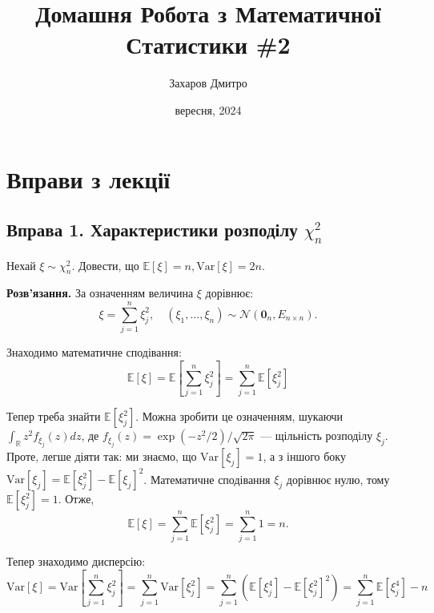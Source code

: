 \documentclass{hw_template}
\title{\huge\sffamily\bfseries Домашня Робота з Математичної Статистики \#2}
\author{\Large\sffamily Захаров Дмитро}
\date{\sffamily 8 вересня, 2024}
\begin{document}
\pagestyle{fancy}

\maketitle

\tableofcontents

\pagebreak

\section{Вправи з лекції}

\subsection{Вправа 1. Характеристики розподілу $\chi_n^2$}
\begin{problem}
    Нехай $\xi \sim \chi_n^2$. Довести, що $\mathbb{E}[\xi]=n, \text{Var}[\xi]=2n$.
\end{problem}

\textbf{Розв'язання.} За означенням величина $\xi$ дорівнює:
\begin{equation*}
    \xi = \sum_{j=1}^n \xi_j^2, \quad (\xi_1,\dots,\xi_n) \sim \mathcal{N}(\mathbf{0}_n, E_{n \times n}).
\end{equation*}

Знаходимо математичне сподівання:
\begin{equation*}
    \mathbb{E}[\xi] = \mathbb{E}\left[\sum_{j=1}^n \xi_j^2\right] = \sum_{j=1}^n \mathbb{E}[\xi_j^2]
\end{equation*}

Тепер треба знайти $\mathbb{E}[\xi_j^2]$. Можна зробити це означенням, шукаючи $\int_{\mathbb{R}}z^2f_{\xi_j}(z)dz$, де $f_{\xi_j}(z)=\exp(-z^2/2)/\sqrt{2\pi}$ --- щільність розподілу $\xi_j$. Проте, легше діяти так: ми знаємо, що $\text{Var}[\xi_j] = 1$, а з іншого боку $\text{Var}[\xi_j] = \mathbb{E}[\xi_j^2]-\mathbb{E}[\xi_j]^2$. Математичне сподівання $\xi_j$ дорівнює нулю, тому $\mathbb{E}[\xi_j^2] = 1$. Отже,
\begin{equation*}
    \mathbb{E}[\xi] = \sum_{j=1}^n \mathbb{E}[\xi_j^2] = \sum_{j=1}^n 1 = n.
\end{equation*}

Тепер знаходимо дисперсію:
\begin{equation*}
    \text{Var}[\xi] = \text{Var}\left[\sum_{j=1}^n \xi_j^2\right] = \sum_{j=1}^n \text{Var}[\xi_j^2] = \sum_{j=1}^n \left(\mathbb{E}[\xi_j^4] - \mathbb{E}[\xi_j^2]^2\right) = \sum_{j=1}^n \mathbb{E}[\xi_j^4] - n
\end{equation*}
\end{document}
